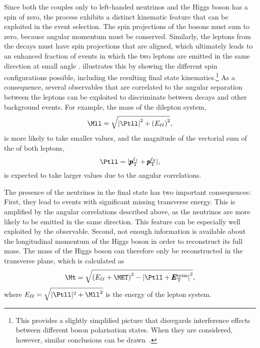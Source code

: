 Since both the \Wboson couples only to left-handed neutrinos and the Higgs boson has a spin of zero, the \HWWdet process exhibits a distinct kinematic feature that can be exploited in the event selection.
The spin projections of the \Wboson bosons must sum to zero, because angular momentum must be conserved.
Similarly, the leptons from the \Wboson decays must have spin projections that are aligned, which ultimately leads to
an enhanced fraction of \HWWdet events in which the two leptons are emitted in the same direction at small angle \dphill.
 illustrates this by showing the different spin configurations possible, including the resulting final state kinematics.\footnote{This provides a slightly simplified picture that disregards interference effects between different \Wboson boson polarisation states. When they are considered, however, similar conclusions can be drawn~\cite{Maina_2021}.}
As a consequence, several observables that are correlated to the angular separation between the leptons can be exploited to discriminate between \HWW decays and other background events. For example, the mass of the dilepton system,
\begin{equation}
    \Mll = \sqrt{\left| \Ptll \right|^2+ \left( E_{\ell\ell} \right)^2},
\end{equation}
is more likely to take smaller values, and the magnitude of the vectorial sum of the \pT of both leptons,
\begin{equation}
    \Ptll = |\pmb{p}_\text{T}^{\ell_1} + \pmb{p}_\text{T}^{\ell_2}|,
\end{equation}
is expected to take larger values due to the angular correlations.

The presence of the neutrinos in the final state has two important consequences:
First, they lead to events with significant missing transverse energy. This is amplified by the angular correlations described above, as the neutrinos are more likely to be emitted in the same direction. This feature can be especially well exploited by the \METSig observable.
Second, not enough information is available about the longitudinal momentum of the Higgs boson in order to reconstruct its full mass. The mass of the Higgs boson can therefore only be reconstructed in the transverse plane, which is calculated as
\begin{equation}
  \Mt = \sqrt{ \left( E_{\ell\ell}+\MET \right)^2 - \left| \Ptll + \pmb{E}_{\text{T}}^{\text{miss}} \right|^2 },
\end{equation}
where $E_{\ell\ell} = \sqrt{ |\Ptll|^2 + \Mll^2}$ is the energy of the lepton system.

